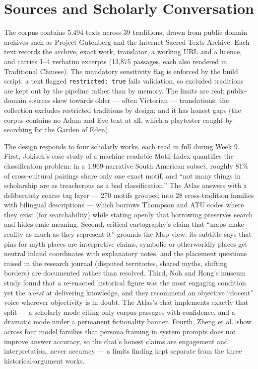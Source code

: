 \documentclass[12pt,a4paper]{article}
\begin{document}
\section{Sources and Scholarly Conversation}

The corpus contains 5{,}494 texts across 39 traditions, drawn from
public-domain archives such as Project Gutenberg and the Internet Sacred
Texts Archive.\autocite{gutenberg,sacredtexts} Each text records the
archive, exact work, translator, a working URL and a licence, and carries
1--4 verbatim excerpts (13{,}875 passages, each also rendered in Traditional
Chinese). The mandatory sensitivity flag is enforced by the build script:
a text flagged \texttt{restricted: true} fails validation, so excluded
traditions are kept out by the pipeline rather than by memory. The limits
are real: public-domain sources skew towards older --- often Victorian ---
translations; the collection excludes restricted traditions by design; and
it has honest gaps (the corpus contains no Adam and Eve text at all, which
a playtester caught by searching for the Garden of Eden).

The design responds to four scholarly works, each read in full during Week
9. First, Jokisch's case study of a machine-readable Motif-Index quantifies
the classification problem: in a 1{,}969-narrative South American subset,
roughly 81\% of cross-cultural pairings share only one exact motif, and
``not many things in scholarship are as treacherous as a bad
classification.''\autocite[31]{jokisch2025motif} The Atlas answers with a
deliberately coarse tag layer --- 270 motifs grouped into 28 cross-tradition
families with bilingual descriptions --- which borrows Thompson and ATU codes
where they exist (for searchability) while stating openly that borrowing
preserves search and hides emic meaning. Second, critical cartography's
claim that ``maps make reality as much as they represent
it''\autocite[15]{crampton2005critical} grounds the Map view: its subtitle
says that pins for myth places are interpretive claims, symbolic or
otherworldly places get neutral inland coordinates with explanatory notes,
and the placement questions raised in the research journal (disputed
territories, shared myths, shifting borders) are documented rather than
resolved. Third, Noh and Hong's museum study found that a re-enacted
historical figure was the most engaging condition yet the \emph{worst} at
delivering knowledge, and they recommend an objective ``docent'' voice
wherever objectivity is in
doubt.\autocite[9, 12--13]{noh2021chatbots} The Atlas's chat implements
exactly that split --- a scholarly mode citing only corpus passages with
confidence, and a dramatic mode under a permanent fictionality banner.
Fourth, Zheng et al.\ show across four model families that persona framing
in system prompts does not improve answer
accuracy,\autocite[15126]{zheng2024personas} so the chat's honest claims are
engagement and interpretation, never accuracy --- a limits finding kept
separate from the three historical-argument works.
\end{document}
